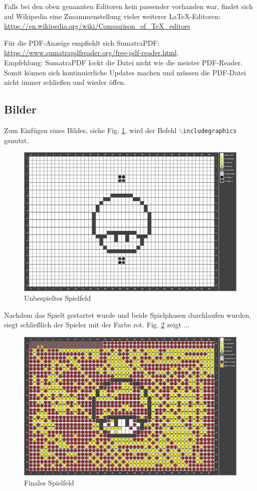 \documentclass[conference]{IEEEtran}
\begin{document}
Falls bei den oben genannten Editoren kein passender vorhanden war, findet sich auf Wikipedia eine Zusammenstellung vieler weiterer \LaTeX-Editoren:\\
\url{https://en.wikipedia.org/wiki/Comparison_of_TeX_editors}

Für die PDF-Anzeige empfiehlt sich SumatraPDF: \\ 
\url{https://www.sumatrapdfreader.org/free-pdf-reader.html}. \\
Empfehlung: SumatraPDF lockt die Datei nicht wie die meister PDF-Reader. Somit können sich kontinuierliche Updates machen und müssen die PDF-Datei nicht immer schließen und wieder öffen.



\subsection{Bilder}
Zum Einfügen eines Bildes, siehe Fig. \ref{fig:reversi01}, wird  der Befehl \texttt{$\backslash$includegraphics} genutzt.

\begin{figure}[htbp]
	\centering
	\includegraphics[width=0.7\linewidth]{figures/gamefield01.png}
	\caption[Spielfeld 01]{Unbespieltes Spielfeld}
	\label{fig:reversi01}
\end{figure}

Nachdem das Spielt gestartet wurde und beide Spielphasen durchlaufen wurden, siegt schließlich der Spieler mit der Farbe rot. Fig. \ref{fig:reversi02} zeigt ...

\begin{figure}[htbp]
	\centering
	\includegraphics[width=0.7\linewidth]{figures/gamefield02.png}
	\caption[Spielfeld 02]{Finales Spielfeld}
	\label{fig:reversi02}
\end{figure}
\end{document}
